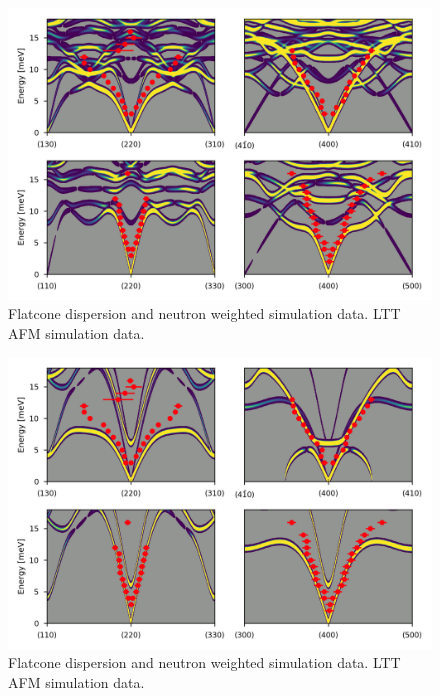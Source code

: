 \begin{figure}[]
    \centering
    \includegraphics[width=\textwidth]{fig/lowen/flatcone_fits_simulation_ltt_afm.png}
    \caption[Flatcone dispersion and neutron weighted simulation data]{Flatcone dispersion and neutron weighted simulation data. LTT AFM simulation data.}
    \label{fig:flatcone_phonons_dispersion_simulation_e2}
\end{figure}

\begin{figure}[]
    \centering
    \includegraphics[width=\textwidth]{fig/lowen/flatcone_fits_simulation_htt_metal.png}
    \caption[Flatcone dispersion and neutron weighted simulation data]{Flatcone dispersion and neutron weighted simulation data. LTT AFM simulation data.}
    \label{fig:flatcone_phonons_dispersion_simulation_e3}
\end{figure}

